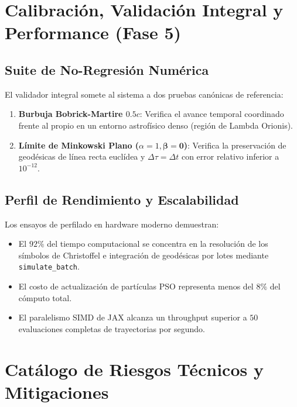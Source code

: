 \documentclass[11pt,a4paper]{article}
\begin{document}
\section{Calibración, Validación Integral y Performance (Fase 5)}

\subsection{Suite de No-Regresión Numérica}
El validador integral somete al sistema a dos pruebas canónicas de referencia:
\begin{enumerate}
    \item \textbf{Burbuja Bobrick-Martire $0.5c$}: Verifica el avance temporal coordinado frente al propio en un entorno astrofísico denso (región de Lambda Orionis).
    \item \textbf{Límite de Minkowski Plano ($\alpha=1, \boldsymbol{\beta}=\mathbf{0}$)}: Verifica la preservación de geodésicas de línea recta euclídea y $\Delta \tau = \Delta t$ con error relativo inferior a $10^{-12}$.
\end{enumerate}

\subsection{Perfil de Rendimiento y Escalabilidad}
Los ensayos de perfilado en hardware moderno demuestran:
\begin{itemize}
    \item El $92\%$ del tiempo computacional se concentra en la resolución de los símbolos de Christoffel e integración de geodésicas por lotes mediante \texttt{simulate\_batch}.
    \item El costo de actualización de partículas PSO representa menos del $8\%$ del cómputo total.
    \item El paralelismo SIMD de JAX alcanza un throughput superior a $50$ evaluaciones completas de trayectorias por segundo.
\end{itemize}

\section{Catálogo de Riesgos Técnicos y Mitigaciones}
\end{document}
